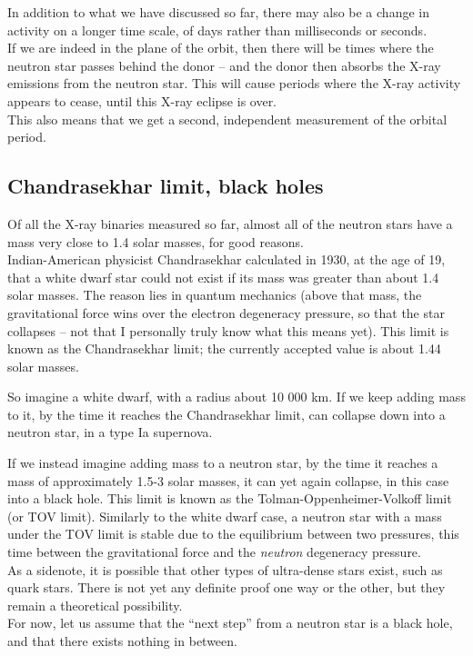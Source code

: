 \documentclass[8.01x]{subfiles}
\begin{document}
In addition to what we have discussed so far, there may also be a change in activity on a longer time scale, of days rather than milliseconds or seconds.\\
If we are indeed in the plane of the orbit, then there will be times where the neutron star passes behind the donor -- and the donor then absorbs the X-ray emissions from the neutron star. This will cause periods where the X-ray activity appears to cease, until this X-ray eclipse is over.\\
This also means that we get a second, independent measurement of the orbital period.

\subsection{Chandrasekhar limit, black holes}

Of all the X-ray binaries measured so far, almost all of the neutron stars have a mass very close to 1.4 solar masses, for good reasons.\\
Indian-American physicist Chandrasekhar calculated in 1930, at the age of 19, that a white dwarf star could not exist if its mass was greater than about 1.4 solar masses. The reason lies in quantum mechanics (above that mass, the gravitational force wins over the electron degeneracy pressure, so that the star collapses -- not that I personally truly know what this means yet). This limit is known as the Chandrasekhar limit; the currently accepted value is about 1.44 solar masses.

So imagine a white dwarf, with a radius about 10 000 km. If we keep adding mass to it, by the time it reaches the Chandrasekhar limit, can collapse down into a neutron star, in a type Ia supernova.

If we instead imagine adding mass to a neutron star, by the time it reaches a mass of approximately 1.5-3 solar masses, it can yet again collapse, in this case into a black hole. This limit is known as the Tolman-Oppenheimer-Volkoff limit (or TOV limit). Similarly to the white dwarf case, a neutron star with a mass under the TOV limit is stable due to the equilibrium between two pressures, this time between the gravitational force and the \emph{neutron} degeneracy pressure.\\
As a sidenote, it is possible that other types of ultra-dense stars exist, such as quark stars. There is not yet any definite proof one way or the other, but they remain a theoretical possibility.\\
For now, let us assume that the ``next step'' from a neutron star is a black hole, and that there exists nothing in between.
\end{document}

